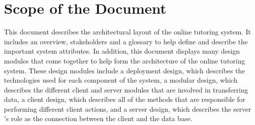 \chapter{Scope of the Document}
This document describes the architectural layout of the online tutoring system. It includes an overview, stakeholders and a glossary to help define and describe the important system attributes. In addition, this document displays many design modules that come together to help form the architecture of the online tutoring system.  These design modules include a deployment design, which describes the technologies used for each component of the system, a  modular design, which describes the different client and server modules that are involved in transferring data, a client design, which describes all of the methods that are responsible for performing different client actions, and a server design, which describes the server$'$s role as the connection between the client and the data base.     


